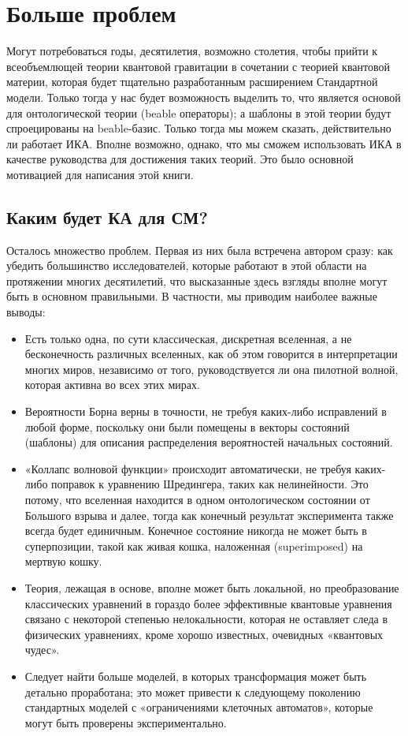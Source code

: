 \documentclass[main.tex]{subfiles}
\begin{document}
\section{Больше проблем}\label{ch8}

Могут потребоваться годы, десятилетия, возможно столетия, чтобы прийти к всеобъемлющей теории квантовой гравитации в сочетании с теорией квантовой материи, которая будет тщательно разработанным расширением Стандартной модели. Только тогда у нас будет возможность выделить то, что является основой для онтологической теории (beable операторы); а шаблоны в этой теории будут спроецированы на beable-базис. Только тогда мы можем сказать, действительно ли работает ИКА. Вполне возможно, однако, что мы сможем использовать ИКА в качестве руководства для достижения таких теорий. Это было основной мотивацией для написания этой книги.

\subsection{Каким будет КА для СМ?}\label{ch8.1}

Осталось множество проблем. Первая из них была встречена автором сразу: как убедить большинство исследователей, которые работают в этой области на протяжении многих десятилетий, что высказанные здесь взгляды вполне могут быть в основном правильными. В частности, мы приводим наиболее важные выводы:

\begin{itemize}
\item Есть только одна, по сути классическая, дискретная вселенная, а не бесконечность различных вселенных, как об этом говорится в интерпретации многих миров, независимо от того, руководствуется ли она пилотной волной, которая активна во всех этих мирах.
\item Вероятности Борна верны в точности, не требуя каких-либо исправлений в любой форме, поскольку они были помещены в векторы состояний (шаблоны) для описания распределения вероятностей начальных состояний. 
\item «Коллапс волновой функции» происходит автоматически, не требуя каких-либо поправок к уравнению Шредингера, таких как нелинейности. Это потому, что вселенная находится в одном онтологическом состоянии от Большого взрыва и далее, тогда как конечный результат эксперимента также всегда будет единичным. Конечное состояние никогда не может быть в суперпозиции, такой как живая кошка, наложенная (superimposed) на мертвую кошку.
\item Теория, лежащая в основе, вполне может быть локальной, но преобразование классических уравнений в гораздо более эффективные квантовые уравнения связано с некоторой степенью нелокальности, которая не оставляет следа в физических уравнениях, кроме хорошо известных, очевидных «квантовых чудес».
\item Следует найти больше моделей, в которых трансформация может быть детально проработана; это может привести к следующему поколению стандартных моделей с «ограничениями клеточных автоматов», которые могут быть проверены экспериментально.
\end{itemize}
\end{document}
